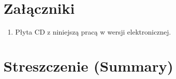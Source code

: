 \documentclass[12pt]{mwbk}
\theoremstyle{plain}
\theoremstyle{definition}
\theoremstyle{remark}
\begin{document}
\listoffigures

\listoftables


\chapter*{Załączniki}
\begin{enumerate}
\item Płyta CD z niniejszą pracą w wersji elektronicznej.
\end{enumerate}




\chapter*{Streszczenie (Summary)}

\bigskip
\bigskip

\begin{center}
  \textbf{\tytul}
\end{center}




\bigskip

\begin{center}
  \textbf{\textit{\tytulangielski}}
\end{center}



{\it

}
\end{document}
